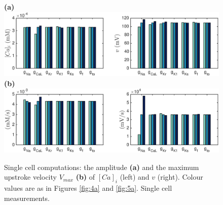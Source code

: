 \documentclass{article}
\begin{document}
\begin{figure}
 \textbf{(a)}  \includegraphics[trim=1cm 0cm 2cm 0cm, clip=true, width=1\linewidth]{sc_amplitude} 
 \textbf{(b)}  \includegraphics[trim=1cm 0cm 2cm 0cm, clip=true, width=1\linewidth]{sc_v_max} 
    \caption{Single cell computations: the amplitude \textbf{(a)} and the maximum upstroke velocity $V_{max}$ \textbf{(b)} of $[Ca]_i$ (left) and $v$ (right).  Colour values are as in Figures \ref{fig:4a} and \ref{fig:5a}. Single cell measurements.}
    \label{fig:6a}
\end{figure}
%
\end{document}
